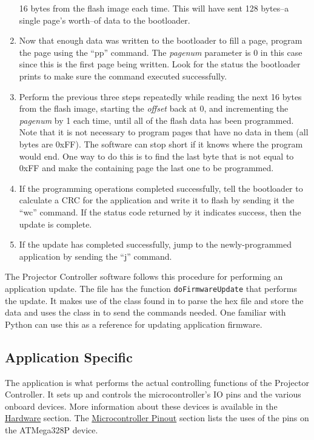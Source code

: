 \documentclass{article}
\begin{document}
\begin{enumerate}
    16 bytes from the flash image each time.  This will have sent 128 bytes--a single page's
    worth--of data to the bootloader.
  \item Now that enough data was written to the bootloader to fill a page, program the page using
    the ``pp'' command.  The \emph{pagenum} parameter is 0 in this case since this is the first page
    being written.  Look for the status the bootloader prints to make sure the command executed
    successfully.
  \item Perform the previous three steps repeatedly while reading the next 16 bytes from the flash
    image, starting the \emph{offset} back at 0, and incrementing the \emph{pagenum} by 1 each time,
    until all of the flash data has been programmed.  Note that it is not necessary to program pages
    that have no data in them (all bytes are 0xFF).  The software can stop short if it knows where
    the program would end.  One way to do this is to find the last byte that is not equal to 0xFF
    and make the containing page the last one to be programmed.
  \item If the programming operations completed successfully, tell the bootloader to calculate a CRC
    for the application and write it to flash by sending it the ``wc'' command.  If the status code
    returned by it indicates success, then the update is complete.
  \item If the update has completed successfully, jump to the newly-programmed application by sending
    the ``j'' command.
\end{enumerate}

The Projector Controller software follows this procedure for performing an application update.  The
file  has the function \texttt{doFirmwareUpdate} that performs the
update.  It makes use of the class found in  to parse the hex file and
store the data and uses the class in  to send the commands needed.
One familiar with Python can use this as a reference for updating application firmware.

\subsection{Application Specific} \label{ssec:FWApplication}
The application is what performs the actual controlling functions of the Projector Controller.  It
sets up and controls the microcontroller's IO pins and the various onboard devices.  More
information about these devices is available in the \hyperref[sec:Hardware]{Hardware} section.  The
\hyperref[ssec:MicroPinout]{Microcontroller Pinout} section lists the uses of the pins on the
ATMega328P device.
\end{document}
